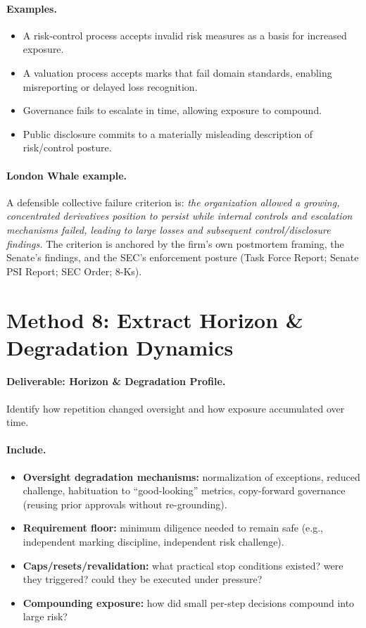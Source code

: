 \paragraph{Examples.}
\begin{itemize}
  \item A risk-control process accepts invalid risk measures as a basis for increased exposure.
  \item A valuation process accepts marks that fail domain standards, enabling misreporting or delayed loss recognition.
  \item Governance fails to escalate in time, allowing exposure to compound.
  \item Public disclosure commits to a materially misleading description of risk/control posture.
\end{itemize}

\paragraph{London Whale example.}
A defensible collective failure criterion is: \emph{the organization allowed a growing, concentrated derivatives position to persist while internal controls and escalation mechanisms failed, leading to large losses and subsequent control/disclosure findings.}
The criterion is anchored by the firm’s own postmortem framing, the Senate’s findings, and the SEC’s enforcement posture (Task Force Report; Senate PSI Report; SEC Order; 8-Ks).

\section{Method 8: Extract Horizon \& Degradation Dynamics}
\label{sec:m8-horizon}

\paragraph{Deliverable: Horizon \& Degradation Profile.}
Identify how repetition changed oversight and how exposure accumulated over time.

\paragraph{Include.}
\begin{itemize}
  \item \textbf{Oversight degradation mechanisms:} normalization of exceptions, reduced challenge, habituation to “good-looking” metrics,
        copy-forward governance (reusing prior approvals without re-grounding).
  \item \textbf{Requirement floor:} minimum diligence needed to remain safe (e.g., independent marking discipline, independent risk challenge).
  \item \textbf{Caps/resets/revalidation:} what practical stop conditions existed? were they triggered? could they be executed under pressure?
  \item \textbf{Compounding exposure:} how did small per-step decisions compound into large risk?
\end{itemize}

